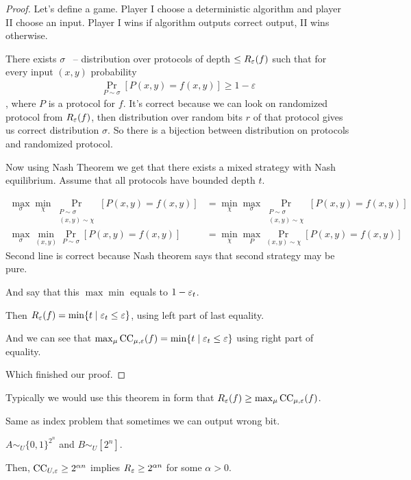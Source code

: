 \begin{proof}
	Let's define a game. Player I choose a deterministic algorithm and player II choose an input. Player I wins if algorithm outputs correct output, II wins otherwise.
	
	There exists $\sigma$ ~-- distribution over protocols of depth $\leq R_\varepsilon(f)$ such that for every input $(x, y)$ probability 
	\begin{align*}
		\Pr_{P \sim \sigma} [P(x, y) = f(x, y)] \geq 1 - \varepsilon
	\end{align*}, where $P$ is a protocol for $f$.
	It's correct because we can look on randomized protocol from $R_\varepsilon(f)$, then distribution over random bits $r$ of that protocol gives us correct distribution $\sigma$. So there is a bijection between distribution on protocols and randomized protocol.
	
 	Now using Nash Theorem we get that there exists a mixed strategy with Nash equilibrium. 
	Assume that all protocols have bounded depth $t$.
	
	\begin{align*}
		\max_\sigma \min_\chi \Pr_{\substack{P \sim \sigma \\ (x, y) \sim \chi}}[P(x, y) = f(x, y)] &= \min_\chi \max_\sigma \Pr_{\substack{P \sim \sigma \\ (x, y) \sim \chi}}[P(x, y) = f(x, y)] \\
		\max_\sigma \min_{(x, y)} \Pr_{P \sim \sigma}[P(x, y) = f(x, y)] &= \min_\chi \max_{P} \Pr_{(x, y) \sim \chi}[P(x, y) = f(x, y)]
	\end{align*}
	Second line is correct because Nash theorem says that second strategy may be pure.
	
	And say that this $\max \min$ equals to $1 - \varepsilon_t$.
	
	Then $R_\varepsilon(f) = \min \{t \mid \varepsilon_t \leq \varepsilon \}$, using left part of last equality.
	
	And we can see that $\max_\mu \operatorname{CC}_{\mu, \varepsilon}(f) = \min \{t \mid \varepsilon_t \leq \varepsilon\}$ using right part of equality.
	
	Which finished our proof.
\end{proof}

Typically we would use this theorem in form that $R_\varepsilon(f) \geq \max_\mu \operatorname{CC}_{\mu, \varepsilon}(f)$.

\begin{thm} \label{problem:INX}
	Same as index problem that sometimes we can output wrong bit.
	
	$A \sim_U \{0, 1\}^{2^n}$ and $B \sim_U [2^n]$.
	
	Then, $\operatorname{CC}_{U, \varepsilon} \geq 2^{\alpha n}$ implies $R_\varepsilon \geq 2^{\alpha n}$ for some $\alpha > 0$.
\end{thm}

